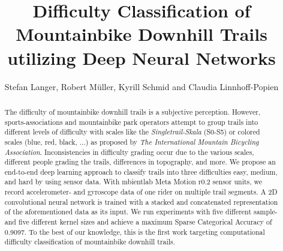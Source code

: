 \documentclass[runningheads]{llncs}
\begin{document}
\title{Difficulty Classification of Mountainbike Downhill Trails utilizing Deep Neural Networks}

\author{Stefan Langer, Robert M\"uller, Kyrill Schmid and Claudia Linnhoff-Popien}

\maketitle

\begin{abstract}
The difficulty of mountainbike downhill trails is a subjective perception. 
However, sports-associations and mountainbike park operators attempt to group trails into different levels of difficulty with scales like the \textit{Singletrail-Skala} (S0-S5) or  colored scales (blue, red, black, ...) as proposed by \textit{The International Mountain Bicycling Association}.
Inconsistencies in difficulty grading occur due to the various scales, different people grading the trails, differences in topography, and more.
We propose an end-to-end deep learning approach to classify trails into three difficulties easy, medium, and hard by using sensor data.
With mbientlab Meta Motion r0.2 sensor units, we record accelerometer- and gyroscope data of one rider on multiple trail segments.
A 2D convolutional neural network is trained with a stacked and concatenated representation of the aforementioned data as its input.
We run experiments with five different sample- and five different kernel sizes and achieve a maximum Sparse Categorical Accuracy of 0.9097.
To the best of our knowledge, this is the first work targeting computational difficulty classification of mountainbike downhill trails.


\end{abstract}
%
%
%
\end{document}
